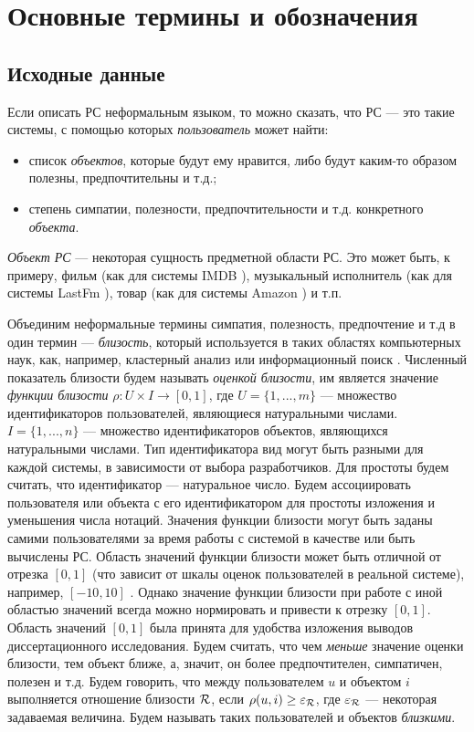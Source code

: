 \section{Основные термины и обозначения}
\subsection{Исходные данные}
Если описать РС неформальным языком, то можно сказать, что РС ---
это такие системы, с помощью которых {\it пользователь} может найти:
\begin{itemize}
	\item список {\it объектов}, которые будут ему нравится, либо
		будут каким-то образом полезны, предпочтительны и т.д.;
\item степень симпатии, полезности, предпочтительности и т.д. конкретного
	{\it объекта}.
\end{itemize}
{\it Объект РС} --- некоторая сущность предметной области РС. Это может быть,
к примеру, фильм (как для системы IMDB \cite{imdb}), музыкальный исполнитель
(как для системы LastFm \cite{lastfm}), товар (как для системы
Amazon \cite{amazon}) и т.п.

Объединим неформальные термины симпатия, полезность, предпочтение и т.д
в один термин --- {\it близость}, который используется в таких
областях компьютерных наук, как, например, кластерный анализ \cite{fdca} или
информационный поиск \cite{ir1,ir2,ir3,ir4}. Численный показатель близости
будем называть
{\it оценкой близости}, им является значение {\it функции
близости} $\rho: U \times I \rightarrow [0,1]$, где
$U = \{1,...,m\}$ --- множество идентификаторов пользователей, являющиеся
натуральными числами.
$I = \{1,...,n\}$ --- множество идентификаторов объектов, являющихся
натуральными числами.
Тип идентификатора
 вид могут быть разными для каждой системы, в зависимости от
выбора разработчиков. Для простоты будем считать, что идентификатор
--- натуральное число. Будем ассоциировать пользователя или объекта с его
идентификатором для простоты изложения и уменьшения числа нотаций.
Значения функции близости могут
быть заданы самими пользователями за время работы с системой в качестве
или быть вычислены РС. Область значений функции близости может быть отличной
от отрезка $[0,1]$ (что зависит от шкалы оценок пользователей в реальной
системе), например, $[-10,10]$  \cite{jester}.
Однако значение функции близости при работе с иной областью
значений всегда можно нормировать \cite{norm}
и привести к отрезку $[0,1]$. Область значений $[0,1]$ была принята для
удобства изложения выводов диссертационного исследования.
Будем считать, что чем {\it меньше} значение оценки близости, тем объект ближе, а, значит,
он более предпочтителен, симпатичен, полезен и т.д.
Будем говорить, что между пользователем $u$ и
объектом $i$ выполняется отношение близости $\mathcal{R}$, если
$\rho(u, i) \ge \varepsilon_{\mathcal{R}}$, где $\varepsilon_{\mathcal{R}}$ --- некоторая
задаваемая величина.
Будем называть таких пользователей и объектов {\it близкими}.


